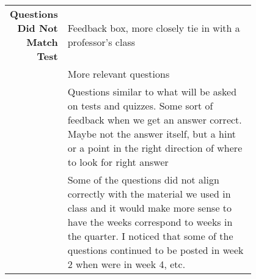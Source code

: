 {\begin{longtable}{R|p{0.8\linewidth}}
		\hline
		\textbf{Questions Did Not Match Test} & Feedback box, more closely tie in with a professor's class                                                                                                                                                                                                                                                                                                                                                                                                                                                                                                                                                                                                                                                                                       \\
		& More relevant questions                                                                                                                                                                                                                                                                                                                                                                                                                                                                                                                                                                                                                                                                                                                          \\
		& Questions similar to what will be asked on tests and quizzes. Some sort of feedback when we get an answer correct. Maybe not the answer itself, but a hint or a point in the right direction of where to look for right answer                                                                                                                                                                                                                                                                                                                                                                                                                                                                                                                   \\
		& Some of the questions did not align correctly with the material we used in class and it would make more sense to have the weeks correspond to weeks in the quarter. I noticed that some of the questions continued to be posted in week 2 when were in week 4, etc.                                                                                                                                                                                                                                                                                                                                                                                                                                                                              \\

\end{longtable}}

